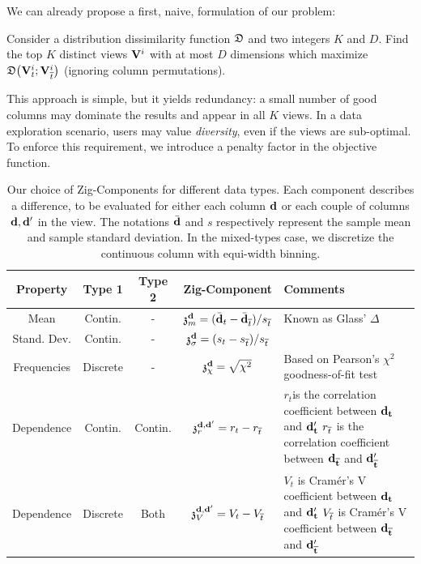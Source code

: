We can already propose a first, naive, formulation of our problem:
\begin{problem}
    Consider a distribution dissimilarity function $\mathfrak{D}$ and two integers
    $K$ and $D$. Find the top $K$ distinct views $\mathbf{V}^i$ with at most $D$
    dimensions which maximize $ \mathfrak{D}\big( \mathbf{V}^i_t ;
    \mathbf{V}^i_{\overline{t}} \big)$ (ignoring column permutations).
\end{problem}

This approach is simple, but it yields redundancy: a small number of good
columns may dominate the results and appear in all $K$ views. In a data
exploration scenario, users may value \emph{diversity}, even if the views are
sub-optimal. To enforce this requirement, we introduce a penalty factor in the
objective function.
\begin{table}[t!]
    \centering
    \begin{tabular}{ccccp{9cm}}
      \hline
    \rowcolor{gray!50}
      Property & Type 1 & Type 2 & Zig-Component & Comments\\
      \hline
      Mean & Contin.  & - &
      $  \mathfrak{z}_m^{\bf{d}}  = (\bar{\bf{d}}_t - \bar{\bf{d}}_{\overline{t}}) / s_{\overline{t}}$ & 
      Known as Glass' $\Delta$~\cite{hedges2014statistical}\\
      Stand. Dev.& Contin.  & - &
      $ \mathfrak{z}_{\sigma}^{\bf{d}}=(s_t-s_{\overline{t}})/s_{\overline{t}}$ & \\
      Frequencies & Discrete & - & 
      $\mathfrak{z}_\chi ^{\bf{d}}= \sqrt{\chi^2}$ &
      Based on Pearson's $\chi^2$ goodness-of-fit test~\cite{wasserman2013all}\\
      Dependence & Contin. & Contin. & $\mathfrak{z}_r^{\bf{d}, \bf{d}'}  = r_t - r_{\overline{t}} $ & 
      $r_t$is the correlation coefficient between $\bf{d}_t$ and  $\bf{d}'_t$\newline
      $r_{\overline{t}}$ is the correlation coefficient between $\bf{d}_{\overline{t}}$ and
      $\bf{d}'_{\overline{t}}$~\cite{wasserman2013all}\\
     Dependence  & Discrete & Both & $ \mathfrak{z}_V^{\bf{d}, \bf{d}'} = V_t - V_{\overline{t}} $ &
           $V_t$ is Cram\'er's V coefficient between $\bf{d}_t$ and  $\bf{d}'_t$ \newline
           $V_{\overline{t}}$ is Cram\'er's V coefficient between $\bf{d}_{\overline{t}}$ and
           $\bf{d}'_{\overline{t}}$~\cite{cohen1977statistical} \\ 
      \hline
    \end{tabular}
    \caption{Our choice of Zig-Components for different data types. Each
        component describes a difference, to be evaluated for either each
        column $\bf{d}$ or each couple of columns $\bf{d}, \bf{d}'$ in the
        view. The notations $\bar{\bf{d}}$ and $s$ respectively represent the
        sample mean and sample standard deviation. In the mixed-types case, we
        discretize the continuous column with equi-width binning.}
    \label{tab:dissim}
\end{table}

